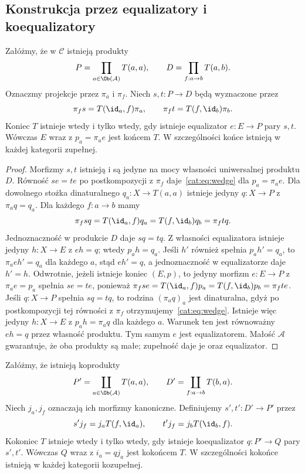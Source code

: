 \subsection{Konstrukcja przez equalizatory i koequalizatory}
\begin{twierdzenie}\label{cat:thm:end-equalizer}
Załóżmy, że w $\mathcal C$ istnieją produkty
\[
 P=\prod_{a\in\Ob(\mathcal A)}T(a,a),
 \qquad D=\prod_{f:a\to b}T(a,b).
\]
Oznaczmy projekcje przez $\pi_a$ i $\pi_f$. Niech $s,t:P\to D$ będą wyznaczone przez
\[
 \pi_f s=T(\id_a,f)\pi_a,\qquad
 \pi_f t=T(f,\id_b)\pi_b .
\]
Koniec $T$ istnieje wtedy i tylko wtedy, gdy istnieje equalizator $e:E\to P$ pary $s,t$. Wówczas $E$ wraz z $p_a=\pi_a e$ jest końcem $T$. W szczególności końce istnieją w każdej kategorii zupełnej.
\end{twierdzenie}
\begin{proof}
Morfizmy $s,t$ istnieją i są jedyne na mocy własności uniwersalnej produktu $D$. Równość $se=te$ po postkompozycji z $\pi_f$ daje~\eqref{cat:eq:wedge} dla $p_a=\pi_a e$. Dla dowolnego stożka dinaturalnego $q_a:X\to T(a,a)$ istnieje jedyny $q:X\to P$ z $\pi_a q=q_a$. Dla każdego $f:a\to b$ mamy
\[
 \pi_f s q=T(\id_a,f)q_a=T(f,\id_b)q_b=\pi_f t q .
\]
Jednoznaczność w produkcie $D$ daje $sq=tq$. Z własności equalizatora istnieje jedyny $h:X\to E$ z $eh=q$; wtedy $p_a h=q_a$. Jeśli $h'$ również spełnia $p_a h'=q_a$, to $\pi_a eh'=q_a$ dla każdego $a$, stąd $eh'=q$, a jednoznaczność w equalizatorze daje $h'=h$. Odwrotnie, jeżeli istnieje koniec $(E,p)$, to jedyny morfizm $e:E\to P$ z $\pi_a e=p_a$ spełnia $se=te$, ponieważ $\pi_f se=T(\id_a,f)p_a=T(f,\id_b)p_b=\pi_f te$. Jeśli $q:X\to P$ spełnia $sq=tq$, to rodzina $(\pi_a q)_a$ jest dinaturalna, gdyż po postkompozycji tej równości z $\pi_f$ otrzymujemy~\eqref{cat:eq:wedge}. Istnieje więc jedyny $h:X\to E$ z $p_a h=\pi_a q$ dla każdego $a$. Warunek ten jest równoważny $eh=q$ przez własność produktu. Tym samym $e$ jest equalizatorem. Małość $\mathcal A$ gwarantuje, że oba produkty są małe; zupełność daje je oraz equalizator.
\end{proof}
\begin{twierdzenie}\label{cat:thm:coend-coequalizer}
Załóżmy, że istnieją koprodukty
\[
 P'=\coprod_{a\in\Ob(\mathcal A)}T(a,a),
 \qquad D'=\coprod_{f:a\to b}T(b,a).
\]
Niech $j_a,j_f$ oznaczają ich morfizmy kanoniczne. Definiujemy $s',t':D'\to P'$ przez
\[
 s'j_f=j_a T(f,\id_a),\qquad
 t'j_f=j_b T(\id_b,f).
\]
Kokoniec $T$ istnieje wtedy i tylko wtedy, gdy istnieje koequalizator $q:P'\to Q$ pary $s',t'$. Wówczas $Q$ wraz z $i_a=qj_a$ jest kokońcem $T$. W szczególności kokońce istnieją w każdej kategorii kozupełnej.
\end{twierdzenie}

